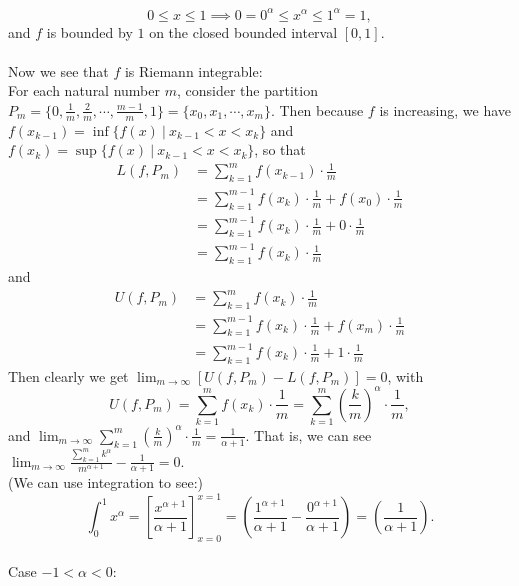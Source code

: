 \begin{enumerate}
    \[
        0\le x\le1\implies 0=0^\alpha\le x^\alpha\le1^\alpha=1,
    \]
    and $f$ is bounded by $1$ on the closed bounded interval $[0,1]$.\\
    \\Now we see that $f$ is Riemann integrable:
    \\For each natural number $m$, consider the partition $P_m=\{0,\frac{1}{m},\frac{2}{m},\cdots,\frac{m-1}{m},1\}=\{x_0,x_1,\cdots,x_m\}$.
    Then because $f$ is increasing, we have $f(x_{k-1})=\inf\{f(x)\ |\ x_{k-1}<x<x_k\}$ and $f(x_k)=\sup\{f(x)\ |\ x_{k-1}<x<x_k\}$, so that
    \begin{align*}
        L(f,P_m)&=\sum_{k=1}^m f(x_{k-1})\cdot\frac{1}{m}\\
        &=\sum_{k=1}^{m-1} f(x_k)\cdot\frac{1}{m}+f(x_0)\cdot\frac{1}{m}\\
        &=\sum_{k=1}^{m-1} f(x_k)\cdot\frac{1}{m}+0\cdot\frac{1}{m}\\
        &=\sum_{k=1}^{m-1} f(x_k)\cdot\frac{1}{m}
    \end{align*}
    and
    \begin{align*}
        U(f,P_m)&=\sum_{k=1}^m f(x_k)\cdot\frac{1}{m}\\
        &=\sum_{k=1}^{m-1} f(x_k)\cdot\frac{1}{m}+f(x_m)\cdot\frac{1}{m}\\
        &=\sum_{k=1}^{m-1} f(x_k)\cdot\frac{1}{m}+1\cdot\frac{1}{m}
    \end{align*}
    Then clearly we get $\lim_{m\to\infty}[U(f,P_m)-L(f,P_m)]=0$, with 
    \[
        U(f,P_m)=\sum_{k=1}^{m} f(x_k)\cdot\frac{1}{m}=\sum_{k=1}^{m} (\frac{k}{m})^\alpha\cdot\frac{1}{m},
    \]
    and $\lim_{m\to\infty}\sum_{k=1}^{m} (\frac{k}{m})^\alpha\cdot\frac{1}{m}=\frac{1}{\alpha+1}$.
    That is, we can see $\lim_{m\to\infty} \frac{\sum_{k=1}^{m}k^\alpha}{m^{\alpha+1}}-\frac{1}{\alpha+1}=0$.
    \\(We can use integration to see:)
    \[
        \int_0^1x^\alpha = \left[\frac{x^{\alpha+1}}{\alpha+1}\right]_{x=0}^{x=1}=\left(\frac{1^{\alpha+1}}{\alpha+1}-\frac{0^{\alpha+1}}{\alpha+1}\right)=\left(\frac{1}{\alpha+1}\right).
    \]
    \\Case $-1<\alpha<0$:

\end{enumerate}

